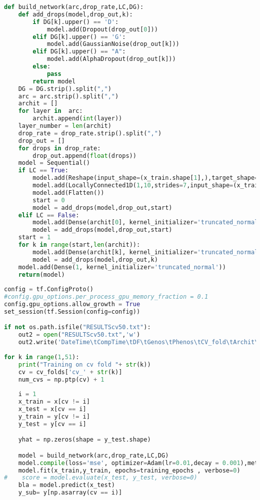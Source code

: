 \begin{lstlisting}[language=Python]
def build_network(arc,drop_rate,LC,DG):
    def add_drops(model,drop_out,k):
        if DG[k].upper() == 'D':
            model.add(Dropout(drop_out[0]))
        elif DG[k].upper() == 'G':
            model.add(GaussianNoise(drop_out[k]))
        elif DG[k].upper() == "A":
            model.add(AlphaDropout(drop_out[k]))
        else:
            pass
        return model    
    DG = DG.strip().split(",")
    arc = arc.strip().split(",")
    archit = []
    for layer in  arc:
        archit.append(int(layer))
    layer_number = len(archit)        
    drop_rate = drop_rate.strip().split(",")
    drop_out = []
    for drops in drop_rate:
        drop_out.append(float(drops)) 
    model = Sequential()
    if LC == True:
        model.add(Reshape(input_shape=(x_train.shape[1],),target_shape=(x_train.shape[1],1)))
        model.add(LocallyConnected1D(1,10,strides=7,input_shape=(x_train.shape[1],1)))
        model.add(Flatten())
        start = 0
        model = add_drops(model,drop_out,start)
    elif LC == False:
        model.add(Dense(archit[0], kernel_initializer='truncated_normal', activation=act, input_shape=(x_train.shape[1],)))
        model = add_drops(model,drop_out,start)
    start = 1
    for k in range(start,len(archit)):
        model.add(Dense(archit[k], kernel_initializer='truncated_normal', activation=act))
        model = add_drops(model,drop_out,k)
    model.add(Dense(1, kernel_initializer='truncated_normal'))
    return(model)
     
config = tf.ConfigProto()
#config.gpu_options.per_process_gpu_memory_fraction = 0.1
config.gpu_options.allow_growth = True
set_session(tf.Session(config=config))

if not os.path.isfile("RESULTScv50.txt"):
    out2 = open("RESULTScv50.txt",'w')
    out2.write('DateTime\tCompTime\tDF\tGenos\tPhenos\tCV_fold\tArchit\tConv\tActFun\tEpochs\tdrop_rate\tAccuracy\n' )
    
for k in range(1,51):
    print("Training on cv fold "+ str(k))
    cv = cv_folds['cv_' + str(k)]
    num_cvs = np.ptp(cv) + 1
    
    i = 1
    x_train = x[cv != i] 
    x_test = x[cv == i] 
    y_train = y[cv != i]
    y_test = y[cv == i]

    yhat = np.zeros(shape = y_test.shape)

    model = build_network(arc,drop_rate,LC,DG)
    model.compile(loss='mse', optimizer=Adam(lr=0.01,decay = 0.001),metrics=['accuracy'])
    model.fit(x_train,y_train, epochs=training_epochs , verbose=0) 
#    score = model.evaluate(x_test, y_test, verbose=0)
    bla = model.predict(x_test)
    y_sub= y[np.asarray(cv == i)]
    

\end{lstlisting}
